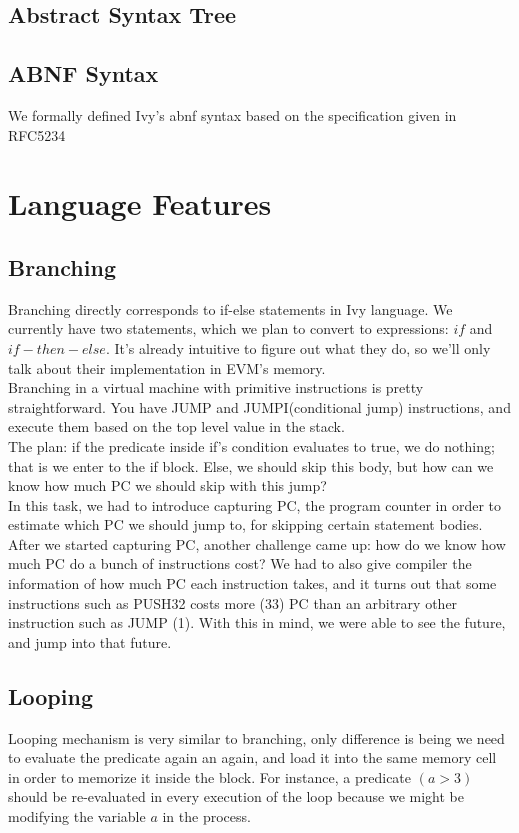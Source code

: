 \documentclass{article}
\begin{document}
\subsection{Abstract Syntax Tree}
\label{subsec:ast}

\subsection{ABNF Syntax}
We formally defined Ivy's abnf syntax based on the specification given in RFC5234\cite{rfc_5234}
\label{subsec:abnf_syntax}

\newpage
\section{Language Features}
\subsection{Branching}
Branching directly corresponds to if-else statements in Ivy language. We currently have two statements, which we plan to convert to expressions: $if$ and $if-then-else$. It's already intuitive to figure out what they do, so we'll only talk about their implementation in EVM's memory. \\

Branching in a virtual machine with primitive instructions is pretty straightforward. You have JUMP and JUMPI(conditional jump) instructions, and execute them based on the top level value in the stack. \\

The plan: if the predicate inside if's condition evaluates to true, we do nothing; that is we enter to the if block. Else, we should skip this body, but how can we know how much PC we should skip with this jump? \\

In this task, we had to introduce capturing PC, the program counter in order to estimate which PC we should jump to, for skipping certain statement bodies. After we started capturing PC, another challenge came up: how do we know how much PC do a bunch of instructions cost? We had to also give compiler the information of how much PC each instruction takes, and it turns out that some instructions such as PUSH32 costs more (33) PC than an arbitrary other instruction such as JUMP (1). With this in mind, we were able to see the future, and jump into that future.

\subsection{Looping}
Looping mechanism is very similar to branching, only difference is being we need to evaluate the predicate again an again, and load it into the same memory cell in order to memorize it inside the block. For instance, a predicate $(a > 3)$ should be re-evaluated in every execution of the loop because we might be modifying the variable $a$ in the process. \\
\end{document}
